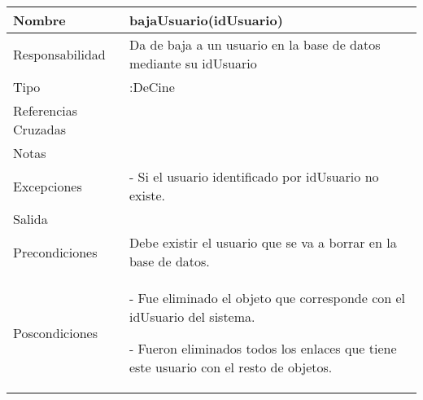 \documentclass{article}
\begin{document}
\begin{table}[h]
\begin{tabular}{|l|l|l|l|l|l|}
\hline
\multicolumn{2}{|p{3cm}|}{Nombre} & \multicolumn{3}{p{8cm}|}{\textbf{bajaUsuario(idUsuario)}}\\
\hline
\multicolumn{2}{|p{3cm}|}{Responsabilidad} & \multicolumn{4}{p{8cm}|}{Da de baja a un usuario en la base de datos mediante su idUsuario} \\
\hline
\multicolumn{2}{|p{3cm}|}{Tipo} & \multicolumn{4}{p{8cm}|}{:DeCine} \\
\hline
\multicolumn{2}{|p{3cm}|}{Referencias Cruzadas} & \multicolumn{4}{p{8cm}|}{} \\
\hline
\multicolumn{2}{|p{3cm}|}{Notas} & \multicolumn{4}{p{8cm}|}{} \\
\hline
\multicolumn{2}{|p{3cm}|}{Excepciones} & \multicolumn{4}{p{8cm}|}{-	Si el usuario identificado por idUsuario no existe.} \\
\hline
\multicolumn{2}{|p{3cm}|}{Salida} & \multicolumn{4}{p{8cm}|}{} \\
\hline
\multicolumn{2}{|p{3cm}|}{Precondiciones} & \multicolumn{4}{p{8cm}|}{Debe existir el usuario que se va a borrar en la base de datos.} \\
\hline
\multicolumn{2}{|p{3cm}|}{Poscondiciones} & \multicolumn{4}{p{8cm}|}{- Fue eliminado el objeto que corresponde con el idUsuario del sistema.

- Fueron eliminados todos los enlaces que tiene este usuario con el resto de objetos.
} \\
\hline
\end{tabular}
\end{table}
\end{document}
